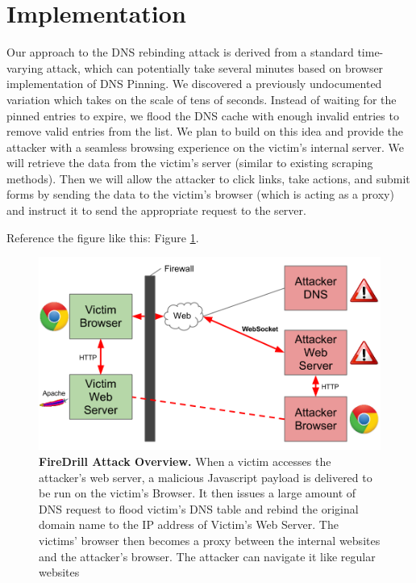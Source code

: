\section{Implementation}
\label{sec:impl}
Our approach to the DNS rebinding attack is derived from a standard time-varying attack, which can potentially take several minutes based on browser implementation of DNS Pinning. We discovered a previously undocumented variation which takes on the scale of tens of seconds. Instead of waiting for the pinned entries to expire, we flood the DNS cache with enough invalid entries to remove valid entries from the list. We plan to build on this idea and provide the attacker with a seamless browsing experience on the victim's internal server. We will retrieve the data from the victim's server (similar to existing scraping methods). Then we will allow the attacker to click links, take actions, and submit forms by sending the data to the victim's browser (which is acting as a proxy) and instruct it to send the appropriate request to the server.

Reference the figure like this: Figure \ref{fig:firedrill1}.

\begin{figure}[h]
\centering
\includegraphics[width=0.8\columnwidth]{firedrill1.png}
\caption{\textbf{FireDrill Attack Overview.} When a victim accesses the attacker's web server, a malicious Javascript payload is delivered to be run on the victim's Browser. It then issues a large amount of DNS request to flood victim's DNS table and rebind the original domain name to the IP address of Victim's Web Server. The victims' browser then becomes a proxy between the internal websites and the attacker's browser. The attacker can navigate it like regular websites}
\label{fig:firedrill1}
\end{figure}

